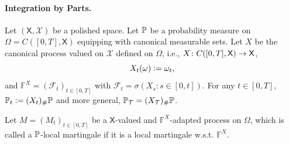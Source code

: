 \paragraph{Integration by Parts.} Let $(\mathsf{X},\mathcal{X})$ be a polished space. Let $\mathbb{P}$ be a probability measure on $\Omega = C([0,T],\mathsf{X})$ equipping with canonical measurable sets. Let $X$ be the canonical process valued on $\mathcal{X}$ defined on $\Omega$, i.e., $X \colon C([0,T],\mathsf{X}) \rightarrow \mathsf{X}$,
\begin{equation*}
    X_t(\omega) \vcentcolon= \omega_t,
\end{equation*}
and $\mathbb{F}^X = (\mathcal{F}_t)_{t \in [0,T]}$ with $\mathcal{F}_t = \sigma(X_s \colon s \in [0,t])$. For any $t \in [0,T]$, $\mathbb{P}_t \vcentcolon= (X_t)_{\#}\mathbb{P}$ and more general, $\mathbb{P}_{\mathcal{T}} = (X_{\mathcal{T}})_{\#}\mathbb{P}$.

Let $M = (M_t)_{t \in [0,T]}$ be a $\mathsf{X}$-valued and $\mathbb{F}^X$-adapted process on $\Omega$, which is called a $\mathbb{P}$-local martingale if it is a local martingale w.s.t. $\mathbb{F}^X$. 

